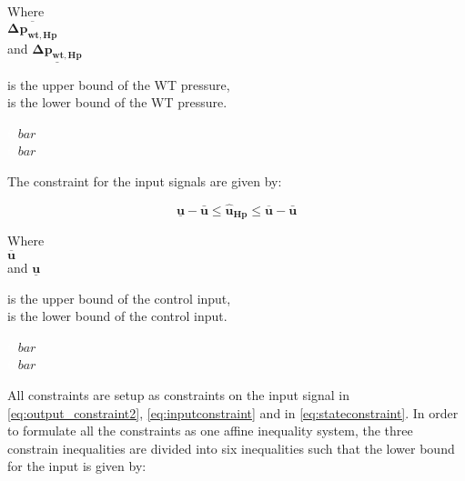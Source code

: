 \begin{minipage}[t]{0.20\textwidth}
Where\\
\hspace*{8mm} $ \overline{\bm{\Delta p_{wt,Hp}}} $ \\
and \hspace*{0.7mm} $ \underline{\bm{\Delta p_{wt,Hp}}} $ 
\end{minipage}
\begin{minipage}[t]{0.68\textwidth}
\vspace*{2mm}
is the upper bound of the WT pressure, \\
is the lower bound of the WT pressure. 
\end{minipage}
\begin{minipage}[t]{0.10\textwidth}
\vspace*{1.8mm}
\textcolor{White}{te}$\unit{bar}$\\
\textcolor{White}{te}$\unit{bar}$
\end{minipage}

The constraint for the input signals are given by: 

\begin{equation}
\underline{\bm{u}} - \bm{\bar{u}} \leq \bm{\hat{u}_{Hp}} \leq \overline{\bm{{u}}} - \bm{\bar{u}}
\label{eq:inputconstraint}
\end{equation}

\begin{minipage}[t]{0.20\textwidth}
Where\\
\hspace*{8mm} $ \overline{\bm{u}} $ \\
and \hspace*{0.7mm} $ \underline{\bm{u}} $ 
\end{minipage}
\begin{minipage}[t]{0.68\textwidth}
\vspace*{2mm}
is the upper bound of the control input, \\
is the lower bound of the control input. 
\end{minipage}
\begin{minipage}[t]{0.10\textwidth}
\vspace*{1.8mm}
\textcolor{White}{te}$\unit{bar}$\\
\textcolor{White}{te}$\unit{bar}$
\end{minipage}

All constraints are setup as constraints on the input signal in \eqref{eq:output_constraint2}, \eqref{eq:inputconstraint} and in \eqref{eq:stateconstraint}. In order to formulate all the constraints as one affine inequality system, the three constrain inequalities are divided into six inequalities such that the lower bound for the input is given by:


